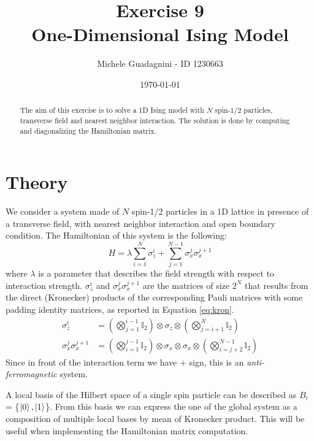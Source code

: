 \documentclass[11pt,a4paper]{article}
\author{Michele Guadagnini - ID 1230663}
\title{\textbf{Exercise 9 \\ One-Dimensional Ising Model}}
\date{\today}
\begin{document}
\maketitle

\vspace{20pt}
\begin{abstract}
	The aim of this exercise is to solve a 1D Ising model with $N$ spin-1/2 particles, transverse field and nearest neighbor interaction. The solution is done by computing and diagonalizing the Hamiltonian matrix.
\end{abstract}

\section{Theory} %

We consider a system made of $N$ spin-1/2 particles in a 1D lattice in presence of a transverse field, with nearest neighbor interaction and open boundary condition. The Hamiltonian of this system is the following:
\begin{equation}
H = \lambda \sum_{i=1}^{N} \sigma_{z}^{i} + \sum_{j=1}^{N-1} \sigma_{x}^{j} \sigma_{x}^{j+1} 
\label{eq:ham}
\end{equation}
where $\lambda$ is a parameter that describes the field strength with respect to interaction strength. 
$\sigma_{z}^{i}$ and $\sigma_{x}^{j}\sigma_{x}^{j+1}$ are the matrices of size $2^N$ that results from the direct (Kronecker) products of the corresponding Pauli matrices with some padding identity matrices, as reported in Equation \ref{eq:kron}.
\begin{equation} \label{eq:kron}
\begin{aligned}
\sigma_{z}^{i} &= ( \bigotimes_{j=1}^{i-1} \mathbb{I}_2 ) \otimes  \sigma_{z} \otimes ( \bigotimes_{j=i+1}^{N} \mathbb{I}_2 ) \\
\sigma_{x}^{j}\sigma_{x}^{j+1} &= ( \bigotimes_{i=1}^{j-1} \mathbb{I}_2 ) \otimes  \sigma_{x} \otimes \sigma_{x} \otimes ( \bigotimes_{i=j+2}^{N-1} \mathbb{I}_2 )
\end{aligned}
\end{equation}
Since in front of the interaction term we have $+$ sign, this is an \textit{anti-ferromagnetic} system.

A local basis of the Hilbert space of a single spin particle can be described as $B_i$ = \{$\ket{0}, \ket{1}$\}. From this basis we can express the one of the global system as a composition of multiple local bases by mean of Kronecker product. This will be useful when implementing the Hamiltonian matrix computation.
\end{document}
